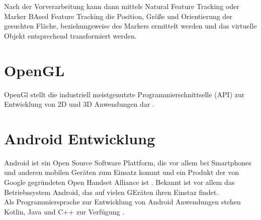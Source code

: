 Nach der Vorverarbeitung kann dann mittels Natural Feature Tracking oder Marker BAsed Feature Tracking die Position, Größe und Orientierung der gesuchten Fläche, beziehungsweise des Markers ermittelt werden und das virtuelle Objekt entsprechend transformiert werden.



\section{OpenGL}\label{OpenGL}
OpenGl stellt die industriell meistgenutzte Programmierschnittselle (API) zur Entwicklung von 2D und 3D Anwendungen dar \citep{khronos:opengl-overview}.

\section{Android Entwicklung}
Android ist ein Open Source Software Plattform, die vor allem bei Smartphones und anderen mobilen Geräten zum Einsatz kommt und ein Produkt der von Google gegründeten Open Handset Alliance ist \citep[S. 4]{gargenta:learning-android}. Bekannt ist vor allem das Betriebssystem Android, das auf vielen GEräten ihren Einstaz findet.\\
Als Programmiersprache zur Entwicklung von Android Anwendungen stehen Kotlin, Java und C++ zur Verfügung \citet{android:fundamentals}.

